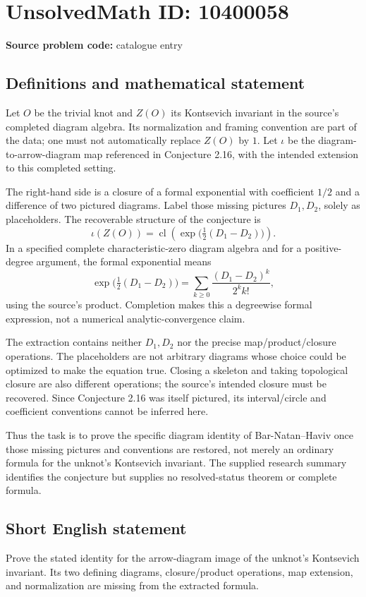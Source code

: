 \documentclass[11pt]{article}
\begin{document}
\section*{UnsolvedMath ID: 10400058}
\textbf{Source problem code:} catalogue entry
\subsection{Definitions and mathematical statement}
Let \(O\) be the trivial knot and \(Z(O)\) its Kontsevich invariant in the source's completed diagram algebra. Its normalization and framing convention are part of the data; one must not automatically replace \(Z(O)\) by \(1\). Let \(\iota\) be the diagram-to-arrow-diagram map referenced in Conjecture 2.16, with the intended extension to this completed setting.

The right-hand side is a closure of a formal exponential with coefficient \(1/2\) and a difference of two pictured diagrams. Label those missing pictures \(D_1,D_2\), solely as placeholders. The recoverable structure of the conjecture is
\[
\iota(Z(O))=
\operatorname{cl}\left(\exp\bigl(\tfrac12(D_1-D_2)\bigr)\right).
\]
In a specified complete characteristic-zero diagram algebra and for a positive-degree argument, the formal exponential means
\[
\exp\bigl(\tfrac12(D_1-D_2)\bigr)
=\sum_{k\ge0}\frac{(D_1-D_2)^k}{2^k k!},
\]
using the source's product. Completion makes this a degreewise formal expression, not a numerical analytic-convergence claim.

The extraction contains neither \(D_1,D_2\) nor the precise map/product/closure operations. The placeholders are not arbitrary diagrams whose choice could be optimized to make the equation true. Closing a skeleton and taking topological closure are also different operations; the source's intended closure must be recovered. Since Conjecture 2.16 was itself pictured, its interval/circle and coefficient conventions cannot be inferred here.

Thus the task is to prove the specific diagram identity of Bar-Natan--Haviv once those missing pictures and conventions are restored, not merely an ordinary formula for the unknot's Kontsevich invariant. The supplied research summary identifies the conjecture but supplies no resolved-status theorem or complete formula.
\subsection{Short English statement}
Prove the stated identity for the arrow-diagram image of the unknot's Kontsevich invariant. Its two defining diagrams, closure/product operations, map extension, and normalization are missing from the extracted formula.
\end{document}
